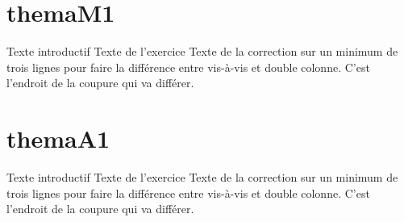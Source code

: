 \documentclass[nocrop]{sesamanuel}
\begin{document}
\themaM
\chapter{themaM1}
\cours  
\begin{methode}
  Texte introductif
  \exercice
  Texte de l’exercice
  \correction
  Texte de la correction sur un minimum de trois lignes pour faire la
  différence entre vis-à-vis et double colonne. C’est l’endroit de la
  coupure qui va différer.
\end{methode}


\themaA
\chapter{themaA1}
\cours  
\begin{methode}
  Texte introductif
  \exercice
  Texte de l’exercice
  \correction
  Texte de la correction sur un minimum de trois lignes pour faire la
  différence entre vis-à-vis et double colonne. C’est l’endroit de la
  coupure qui va différer.
\end{methode}


\AfficheListeMethodes[1]
\end{document}
